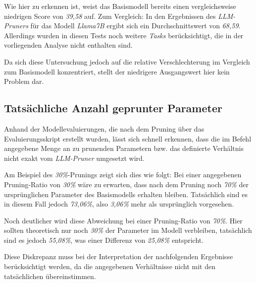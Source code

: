 Wie hier zu erkennen ist, weist das Basismodell bereits einen vergleichsweise
niedrigen Score von \emph{39,58} auf. Zum Vergleich: In den Ergebnissen des
\emph{LLM-Pruners} für das Modell \emph{Llama7B} ergibt sich ein
Durchschnittswert von \emph{68,59}. Allerdings wurden in diesen Tests noch
weitere \emph{Tasks} berücksichtigt, die in der vorliegenden Analyse nicht
enthalten sind.

Da sich diese Untersuchung jedoch auf die relative Verschlechterung im Vergleich
zum Basismodell konzentriert, stellt der niedrigere Ausgangswert hier kein
Problem dar.

\newpage

\subsection{Tatsächliche Anzahl geprunter Parameter}\label{param_count}

Anhand der Modellevaluierungen, die nach dem Pruning über das Evaluierungsskript
erstellt wurden, lässt sich schnell erkennen, dass die im Befehl angegebene
Menge an zu prunenden Parametern bzw. das definierte Verhältnis nicht exakt vom
\emph{LLM-Pruner} umgesetzt wird.

Am Beispiel des \emph{30\%}-Prunings zeigt sich dies wie folgt: Bei einer
angegebenen Pruning-Ratio von \emph{30\%} wäre zu erwarten, dass nach dem
Pruning noch \emph{70\%} der ursprünglichen Parameter des Basismodells erhalten
bleiben. Tatsächlich sind es in diesem Fall jedoch \emph{73,06\%}, also
\emph{3,06\%} mehr als ursprünglich vorgesehen.

Noch deutlicher wird diese Abweichung bei einer Pruning-Ratio von \emph{70\%}.
Hier sollten theoretisch nur noch \emph{30\%} der Parameter im Modell
verbleiben, tatsächlich sind es jedoch \emph{55,08\%}, was einer Differenz von
\emph{25,08\%} entspricht.

Diese Diskrepanz muss bei der Interpretation der nachfolgenden Ergebnisse
berücksichtigt werden, da die angegebenen Verhältnisse nicht mit den
tatsächlichen übereinstimmen.

\begin{table}[h]
	\centering
	\caption{Anzahl der vorhandenen Parameter nach dem Pruning}
	\label{tab:actualparameters}
\end{table}

